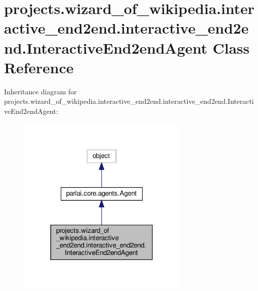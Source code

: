 \hypertarget{classprojects_1_1wizard__of__wikipedia_1_1interactive__end2end_1_1interactive__end2end_1_1InteractiveEnd2endAgent}{}\section{projects.\+wizard\+\_\+of\+\_\+wikipedia.\+interactive\+\_\+end2end.\+interactive\+\_\+end2end.\+Interactive\+End2end\+Agent Class Reference}
\label{classprojects_1_1wizard__of__wikipedia_1_1interactive__end2end_1_1interactive__end2end_1_1InteractiveEnd2endAgent}


Inheritance diagram for projects.\+wizard\+\_\+of\+\_\+wikipedia.\+interactive\+\_\+end2end.\+interactive\+\_\+end2end.\+Interactive\+End2end\+Agent\+:
\nopagebreak
\begin{figure}[H]
\begin{center}
\leavevmode
\includegraphics[width=232pt]{classprojects_1_1wizard__of__wikipedia_1_1interactive__end2end_1_1interactive__end2end_1_1Intera7f68781f07fc62f0d5ec728a6092461d}
\end{center}
\end{figure}


